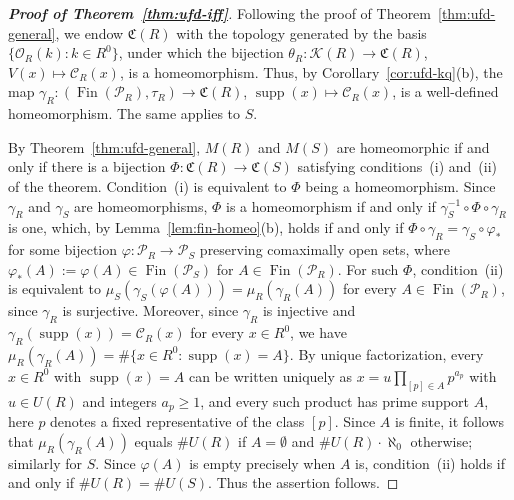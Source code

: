 \documentclass[12pt,reqno,a4paper]{amsart}
\newcommand{\Pe}{\mathcal{P}}
\newcommand{\K}{\mathcal{K}}
\DeclareMathOperator{\Fin}{Fin}
\DeclareMathOperator{\supp}{supp}
\theoremstyle{plain}
\theoremstyle{definition}
\begin{document}
\begin{proof}[\normalfont\bfseries Proof of Theorem~\ref{thm:ufd-iff}]
Following the proof of Theorem~\ref{thm:ufd-general}, we endow $\mathfrak{C}(R)$ with the topology generated by the basis $\{\mathcal{O}_R(k):k\in R^0\}$, under which the bijection $\theta_R\colon\K(R)\to\mathfrak{C}(R)$, $V(x)\mapsto\mathcal{C}_R(x)$, is a homeomorphism. Thus, by Corollary~\ref{cor:ufd-kq}(b), the map $\gamma_R\colon(\Fin(\Pe_R),\tau_R)\to\mathfrak{C}(R)$, $\supp(x)\mapsto\mathcal{C}_R(x)$, is a well-defined homeomorphism. The same applies to $S$.

By Theorem~\ref{thm:ufd-general}, $M(R)$ and $M(S)$ are homeomorphic if and only if there is a bijection $\Phi\colon\mathfrak{C}(R)\to\mathfrak{C}(S)$ satisfying conditions~(i) and~(ii) of the theorem. Condition~(i) is equivalent to $\Phi$ being a homeomorphism. Since $\gamma_R$ and $\gamma_S$ are homeomorphisms, $\Phi$ is a homeomorphism if and only if $\gamma_S^{-1}\circ\Phi\circ\gamma_R$ is one, which, by Lemma~\ref{lem:fin-homeo}(b), holds if and only if $\Phi\circ\gamma_R=\gamma_S\circ\varphi_*$ for some bijection $\varphi\colon\Pe_R\to\Pe_S$ preserving comaximally open sets, where $\varphi_*(A):=\varphi(A)\in\Fin(\Pe_S)$ for $A\in\Fin(\Pe_R)$. For such $\Phi$, condition~(ii) is equivalent to $\mu_S(\gamma_S(\varphi(A)))=\mu_R(\gamma_R(A))$ for every $A\in\Fin(\Pe_R)$, since $\gamma_R$ is surjective. Moreover, since $\gamma_R$ is injective and $\gamma_R(\supp(x))=\mathcal{C}_R(x)$ for every $x\in R^0$, we have $\mu_R(\gamma_R(A))=\#\{x\in R^0:\supp(x)=A\}$. By unique factorization, every $x\in R^0$ with $\supp(x)=A$ can be written uniquely as $x=u\prod\limits_{[p]\in A}p^{a_p}$ with $u\in U(R)$ and integers $a_p\geq1$, and every such product has prime support $A$, here $p$ denotes a fixed representative of the class $[p]$. Since $A$ is finite, it follows that $\mu_R(\gamma_R(A))$ equals $\#U(R)$ if $A=\emptyset$ and $\#U(R)\cdot\aleph_0$ otherwise; similarly for $S$.
 Since $\varphi(A)$ is empty precisely when $A$ is, condition~(ii) holds if and only if $\#U(R)=\#U(S)$. Thus the assertion follows.
\end{proof}
\end{document}
